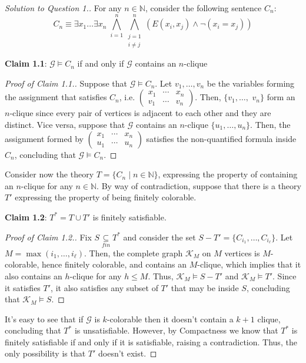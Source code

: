 \documentclass[12pt,a4paper]{report}
\theoremstyle{definition}
\newcommand{\N}{\mathbb{N}}                     %
\begin{document}
    \begin{proof}[Solution to Question 1.]
        For any $n \in \N$, consider the following sentence $C_n$:
        \[C_n \equiv \exists x_1 \ldots \exists x_n \; \bigwedge_{i = 1}^n \bigwedge_{\substack{j = 1 \\i \neq j}}^n (E(x_i, x_j) \land \lnot (x_i = x_j))\] 

        \textbf{Claim 1.1}: $\mathcal{G} \models C_n$ if and only if $\mathcal{G}$ contains an $n$-clique

        \begin{proof}[Proof of Claim 1.1.]
            Suppose that $\mathcal{G} \models C_n$. Let $v_1, \ldots, v_n$ be the variables forming the assignment that satisfies $C_n$, i.e. $\left ( \begin{matrix}
                x_1 & \cdots & x_n \\ v_1 & \cdots & v_n
            \end{matrix} \right )$. Then, $\{v_1, \ldots,$ $v_n\}$ form an $n$-clique since every pair of vertices is adjacent to each other and they are distinct. Vice versa, suppose that $\mathcal{G}$ contains an $n$-clique $\{u_1, \ldots, u_n\}$. Then, the assignment formed by $\left ( \begin{matrix}
                x_1 & \cdots & x_n \\ u_1 & \cdots & u_n 
            \end{matrix}\right )$ satisfies the non-quantified formula inside $C_n$, concluding that $\mathcal{G} \models C_n$.
        \end{proof}

        Consider now the theory $T = \{C_n \mid n \in \N\}$, expressing the property of containing an $n$-clique for any $n \in \N$. By way of contradiction, suppose that there is a theory $T'$ expressing the property of being finitely colorable.

        \textbf{Claim 1.2}: $T^* = T \cup T'$ is finitely satisfiable.
        
        \begin{proof}[Proof of Claim 1.2.]
            Fix $S \underset{fin}{\subseteq} T^*$ and consider the set $S - T' = \{C_{i_1}, \ldots, C_{i_\ell}\}$. Let $M = \max(i_1, \ldots, i_\ell)$. Then, the complete graph $\mathcal{K}_M$ on $M$ vertices is $M$-colorable, hence finitely colorable, and contains an $M$-clique, which implies that it also contains an $h$-clique for any $h \leq M$. Thus, $\mathcal{K}_M \models S-T'$ and $\mathcal{K}_M \models T'$. Since it satisfies $T'$, it also satisfies any subset of $T'$ that may be inside $S$, concluding that $\mathcal{K}_M \models S$. 
        \end{proof}
    
        It's easy to see that if $\mathcal{G}$ is $k$-colorable then it doesn't contain a $k+1$ clique, concluding that $T^*$ is unsatisfiable. However, by Compactness we know that $T^*$ is finitely satisfiable if and only if it is satisfiable, raising a contradiction. Thus, the only possibility is that $T'$ doesn't exist.
    \end{proof}
\end{document}
